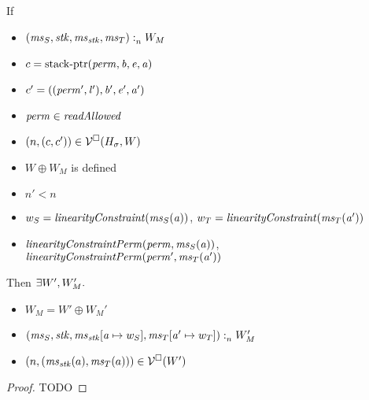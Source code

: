 \documentclass[a4paper]{article}
\begin{document}
\begin{lemma}
  \label{lem:readcond-writecond-work}
  If
  \begin{itemize}
  \item $(\mathit{ms}_S,\mathit{stk},\mathit{ms}_{\mathit{stk}},\mathit{ms}_T) :_{n}^{}W_M$
  \item $c = \mathrm{stack\text{-}ptr}(\mathit{perm},\mathit{b},\mathit{e},\mathit{a})$
  \item $c' = ((\mathit{perm}',\mathit{l}'),\mathit{b}',\mathit{e}',\mathit{a}')$
  \item $\perm \in \readAllowed{}$
  \item $\left(n,(c,c')\right)\in\mathcal{V}^{\square}(H_\sigma,W)$
  \item $W \oplus W_M$ is defined
  \item $n' < n$
  \item $w_S = \linCons{\ms_S(\aaddr)}$, $w_T = \linCons{\ms_T(\aaddr')}$
  \item $\linConsPerm{\perm}{\ms_S(\aaddr)}$, $\linConsPerm{\perm'}{\ms_T(\aaddr')}$
  \end{itemize}
  Then $\exists W', W_M'\ldotp$
  \begin{itemize}
  \item $W_M = W' \oplus W_M'$
  \item $(\mathit{ms}_S,\mathit{stk},\mathit{ms}_{\mathit{stk}}[\mathit{a} \mapsto w_S],\mathit{ms}_T[\mathit{a}' \mapsto w_T]) :_{n}^{}W_M'$
  \item $\left(n,(\mathit{ms}_{\mathit{stk}}(a),\mathit{ms}_T(a))\right) \in \mathcal{V}^{\square}(W')$
  \end{itemize}
\end{lemma}
\begin{proof}
  TODO
\end{proof}
\end{document}
